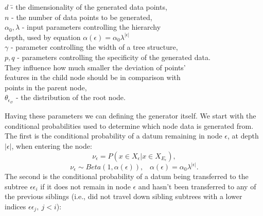\documentclass{article}
\begin{document}
\begin{tabbing}
	$d$ \hspace{10mm} \= - the dimensionality of the generated data points, \\
	$n$ \> - the number of data points to be generated, \\
	$\alpha_0, \lambda$ \> - input parameters controlling the hierarchy\\ \> depth, used by equation $\alpha(\epsilon) = \alpha_0\lambda^{|\epsilon|}$ \\
	$\gamma$ \> - parameter controlling the width of a tree structure, \\
	$p, q$ \> - parameters controlling the specificity of the generated data. \\ \> They influence how much smaller the deviation of points'  \\ \> features in the child node should be in comparison with \\ \> points in the parent node, \\
	$\theta_{\epsilon_\varnothing}$ \> - the distribution of the root node.
\end{tabbing}
	
	Having these parameters we can defining the generator itself. We start with the conditional probabilities used to determine which node data is generated from. The first is the conditional probability of a datum remaining in node $\epsilon$, at depth $|\epsilon|$, when entering the node:
%
\begin{equation}
\nu_\epsilon = P(x \in X_\epsilon | x \in X_{E_\epsilon}),
\end{equation}
%
\begin{equation}\label{eq:alpha_function}
\nu_\epsilon \sim Beta(1, \alpha(\epsilon)),\;\;\; \alpha(\epsilon) = \alpha_0\lambda^{|\epsilon|}.
\end{equation}
	The second is the conditional probability of a datum being transferred to the subtree $\epsilon\epsilon_i$ if it does not remain in node $\epsilon$ and hasn't been transferred to any of the previous siblings (i.e., did not travel down sibling subtrees with a lower indices $\epsilon\epsilon_j,~j < i$): 
\end{document}
